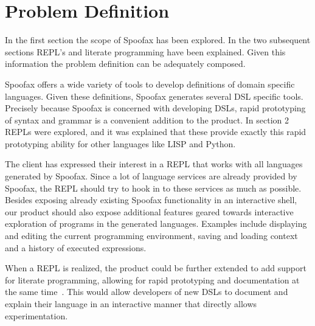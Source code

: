 \section{Problem Definition}
\label{sec:problem-definition}

In the first section the scope of Spoofax has been explored.
In the two subsequent sections REPL's and literate programming have been explained.
Given this information the problem definition can be adequately composed.

Spoofax offers a wide variety of tools to develop definitions of domain specific
languages. Given these definitions, Spoofax generates several DSL specific tools.
Precisely because Spoofax is concerned with developing DSLs, rapid prototyping
of syntax and grammar is a convenient addition to the product.
In section 2 REPLs were explored, and it was explained that these provide exactly
this rapid prototyping ability for other languages like LISP and Python.

The client has expressed their interest in a REPL that works with all languages
generated by Spoofax. Since a lot of language services are already provided
by Spoofax, the REPL should try to hook in to these services as much as possible.
Besides exposing already existing Spoofax functionality in an interactive shell,
our product should also expose additional features geared towards interactive
exploration of programs in the generated languages.
Examples include displaying and editing the current programming environment,
saving and loading context and a history of executed expressions.

When a REPL is realized, the product could be further extended to add support
for literate programming, allowing for rapid prototyping and documentation at
the same time~\cite{org-mode}. This would allow developers of new DSLs to
document and explain their language in an interactive manner that directly
allows experimentation.


